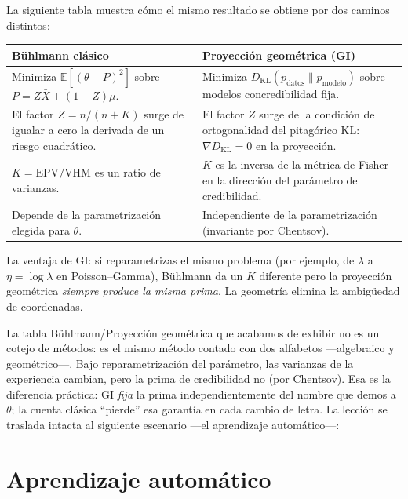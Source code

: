 La siguiente tabla muestra cómo el mismo resultado se obtiene por dos caminos distintos:

\begin{center}
	\renewcommand{\arraystretch}{1.3}
	\begin{tabular}{|p{5.5cm}|p{5.5cm}|}
		\hline
		\textbf{Bühlmann clásico} & \textbf{Proyección geométrica (GI)} \\
		\hline
		Minimiza $\mathbb{E}[(\theta - P)^2]$ sobre $P = Z\bar{X} + (1-Z)\mu$. & Minimiza $D_{\mathrm{KL}}(p_{\text{datos}} \| p_{\text{modelo}})$ sobre modelos concredibilidad fija. \\
		\hline
		El factor $Z = n/(n+K)$ surge de igualar a cero la derivada de un riesgo cuadrático. & El factor $Z$ surge de la condición de ortogonalidad del pitagórico KL: $\nabla D_{\mathrm{KL}} = 0$ en la proyección. \\
		\hline
		$K = \text{EPV}/\text{VHM}$ es un ratio de varianzas. & $K$ es la inversa de la métrica de Fisher en la dirección del parámetro de credibilidad. \\
		\hline
		Depende de la parametrización elegida para $\theta$. & Independiente de la parametrización (invariante por Chentsov). \\
		\hline
	\end{tabular}
\end{center}

\noindent La ventaja de GI: si reparametrizas el mismo problema (por ejemplo, de $\lambda$ a $\eta = \log\lambda$ en Poisson--Gamma), Bühlmann da un $K$ diferente pero la proyección geométrica \emph{siempre produce la misma prima}.  La geometría elimina la ambigüedad de coordenadas.

\bigskip
\noindent
La tabla Bühlmann/Proyección geométrica que acabamos de exhibir no es un cotejo de métodos: es el mismo método contado con dos alfabetos ---algebraico y geométrico---. Bajo reparametrización del parámetro, las varianzas de la experiencia cambian, pero la prima de credibilidad no (por Chentsov). Esa es la diferencia práctica: GI \emph{fija} la prima independientemente del nombre que demos a $\theta$; la cuenta clásica ``pierde'' esa garantía en cada cambio de letra. La lección se traslada intacta al siguiente escenario ---el aprendizaje automático---:

\section{Aprendizaje automático}

